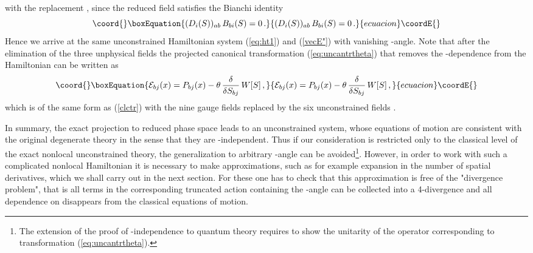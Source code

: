 \documentclass[a4paper,12pt]{article}
\begin{document}
with the replacement \coordHE{},
since the reduced field \coordHE{} satisfies the Bianchi identity
\begin{equation}\coord{}\boxEquation{
\label{BI}
(D_i(S))_{ab} \, B_{bi}(S) = 0\,.
}{
(D_i(S))_{ab} \, B_{bi}(S) = 0\,.
}{ecuacion}\coordE{}\end{equation}
Hence we arrive at the same unconstrained Hamiltonian system
(\ref{eq:ht1}) and (\ref{vecE"}) with vanishing \myHighlight{$\theta$}\coordHE{}-angle.
Note that after the elimination of the three unphysical fields \coordHE{}
the projected canonical transformation (\ref{eq:uncantrtheta})
that removes the \myHighlight{$\theta$}\coordHE{}-dependence from the Hamiltonian can be written as
\begin{equation}\coord{}\boxEquation{
{\cal E}_{bj}(x) =
P_{bj}(x) - \theta \, \frac{\delta}{\delta S_{bj}}\, W[S]\,,
}{
{\cal E}_{bj}(x) =
P_{bj}(x) - \theta \, \frac{\delta}{\delta S_{bj}}\, W[S]\,,
}{ecuacion}\coordE{}\end{equation}
which is of the same form as (\ref{clctr}) with the nine gauge fields
\coordHE{} replaced by the six unconstrained fields \coordHE{}.

In summary, the exact projection to reduced phase space leads to an
unconstrained system,
whose equations of motion are consistent with the original degenerate theory
in the sense that they are \myHighlight{$\theta$}\coordHE{}-independent.
Thus if our consideration is restricted only to
the classical level of the exact nonlocal unconstrained theory, the
generalization to arbitrary \myHighlight{$\theta$}\coordHE{}-angle can be avoided\footnote{
The extension of the proof of \myHighlight{$\theta$}\coordHE{}-independence to
quantum theory requires to show the unitarity of
the operator corresponding to transformation
(\ref{eq:uncantrtheta}).}.
However, in order to work with such a complicated nonlocal
Hamiltonian it is necessary to make approximations, such as for example
expansion in the number of spatial derivatives, which we shall carry
out in the next section.
For these one has to check that this approximation
is free of the "divergence problem", that is all terms in the corresponding
truncated action containing the \myHighlight{$\theta$}\coordHE{}-angle can be collected into a
4-divergence and all dependence on \myHighlight{$\theta$}\coordHE{}
disappears from the classical equations of motion.
\end{document}
